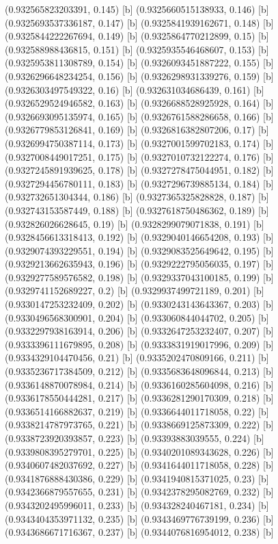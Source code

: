 {{{(0.932565823203391, 0.145) [b] 
(0.9325660515138933, 0.146) [b] 
(0.9325693537336187, 0.147) [b] 
(0.9325841939162671, 0.148) [b] 
(0.9325844222267694, 0.149) [b] 
(0.9325864770212899, 0.15) [b] 
(0.932588988436815, 0.151) [b] 
(0.9325935546468607, 0.153) [b] 
(0.9325953811308789, 0.154) [b] 
(0.9326093451887222, 0.155) [b] 
(0.9326296648234254, 0.156) [b] 
(0.9326298931339276, 0.159) [b] 
(0.9326303497549322, 0.16) [b] 
(0.932631034686439, 0.161) [b] 
(0.9326529524946582, 0.163) [b] 
(0.9326688528925928, 0.164) [b] 
(0.9326693095135974, 0.165) [b] 
(0.9326761588286658, 0.166) [b] 
(0.9326779853126841, 0.169) [b] 
(0.9326816382807206, 0.17) [b] 
(0.9326994750387114, 0.173) [b] 
(0.9327001599702183, 0.174) [b] 
(0.9327008449017251, 0.175) [b] 
(0.9327010732122274, 0.176) [b] 
(0.9327245891939625, 0.178) [b] 
(0.9327278475044951, 0.182) [b] 
(0.9327294456780111, 0.183) [b] 
(0.9327296739885134, 0.184) [b] 
(0.932732651304344, 0.186) [b] 
(0.9327365325828828, 0.187) [b] 
(0.932743153587449, 0.188) [b] 
(0.9327618750486362, 0.189) [b] 
(0.932826026628645, 0.19) [b] 
(0.9328299079071838, 0.191) [b] 
(0.9328456613318413, 0.192) [b] 
(0.9329040146654208, 0.193) [b] 
(0.9329074393229551, 0.194) [b] 
(0.9329083525649642, 0.195) [b] 
(0.9329213662635943, 0.196) [b] 
(0.9329222795056035, 0.197) [b] 
(0.9329277589576582, 0.198) [b] 
(0.9329337043100185, 0.199) [b] 
(0.9329741152689227, 0.2) [b] 
(0.9329937499721189, 0.201) [b] 
(0.9330147253232409, 0.202) [b] 
(0.9330243143643367, 0.203) [b] 
(0.9330496568300901, 0.204) [b] 
(0.933060844044702, 0.205) [b] 
(0.9332297938163914, 0.206) [b] 
(0.9332647253232407, 0.207) [b] 
(0.9333396111679895, 0.208) [b] 
(0.9333831919017996, 0.209) [b] 
(0.9334329104470456, 0.21) [b] 
(0.9335202470809166, 0.211) [b] 
(0.9335236717384509, 0.212) [b] 
(0.9335683648096844, 0.213) [b] 
(0.9336148870078984, 0.214) [b] 
(0.9336160285604098, 0.216) [b] 
(0.9336178550444281, 0.217) [b] 
(0.9336281290170309, 0.218) [b] 
(0.9336514166882637, 0.219) [b] 
(0.9336644011718058, 0.22) [b] 
(0.9338214787973765, 0.221) [b] 
(0.9338669125873309, 0.222) [b] 
(0.9338723920393857, 0.223) [b] 
(0.93393883039555, 0.224) [b] 
(0.9339808395279701, 0.225) [b] 
(0.9340201089343628, 0.226) [b] 
(0.9340607482037692, 0.227) [b] 
(0.9341644011718058, 0.228) [b] 
(0.9341876888430386, 0.229) [b] 
(0.9341940815371025, 0.23) [b] 
(0.9342366879557655, 0.231) [b] 
(0.9342378295082769, 0.232) [b] 
(0.9343202495996011, 0.233) [b] 
(0.934328240467181, 0.234) [b] 
(0.9343404353971132, 0.235) [b] 
(0.9343469776739199, 0.236) [b] 
(0.9343686671716367, 0.237) [b] 
(0.9344076816954012, 0.238) [b] 
}}}
